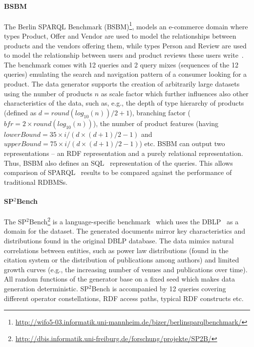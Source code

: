 \paragraph{BSBM} The Berlin SPARQL Benchmark (BSBM)\footnote{\url{http://wifo5-03.informatik.uni-mannheim.de/bizer/berlinsparqlbenchmark/}}, models an e-commerce domain where types Product, Offer and Vendor are used to model the relationships between products and the vendors offering them, while types Person and Review are used to model the relationship between users and product reviews these users write~\cite{Bizer09theberlin}.
The benchmark comes with 12 queries and 2 query mixes (sequences of the 12 queries) emulating the search and navigation pattern of a consumer looking for a product. The data generator supports the creation of arbitrarily large datasets using the number of products $n$ as scale factor which further influences also other characteristics of the data, such as, e.g., the depth of type hierarchy of products (defined as $d = round(log_{10}(n))/2 + 1$), branching factor ($bfr = 2 \times round(log_{10}(n))$), the number of product features (having $lowerBound = 35 \times i / (d \times (d+1)/2 - 1)$ and $upperBound = 75 \times i / (d \times (d+1)/2 - 1)$) etc. BSBM can output two representations -- an RDF representation and a purely relational representation. Thus, BSBM also defines an SQL~\cite{sql} representation of the queries. This allows comparison of SPARQL~\cite{sparql} results  to be compared against the performance of traditional RDBMSs.


\paragraph{SP$^2$Bench} The SP$^2$Bench\footnote{\url{http://dbis.informatik.uni-freiburg.de/forschung/projekte/SP2B/}} is a language-specific benchmark~\cite{Schmidt2010} which uses the DBLP~\cite{dblp} as a domain for the dataset. %
The generated documents mirror key characteristics and distributions found in the original DBLP database. The data mimics natural correlations between entities, such as power law distributions (found in the citation system or the distribution of publications among authors) and limited growth curves (e.g., the increasing number of venues and publications over time). All random functions of the generator base on a fixed seed which makes data generation deterministic. SP$^2$Bench is accompanied by 12 queries covering different operator constellations, RDF access paths, typical RDF constructs etc.

